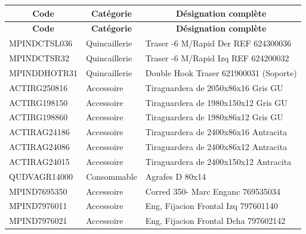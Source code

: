 \documentclass[12pt,a4paper]{article}
\begin{document}
\begin{longtable}{|p{3cm}|p{3cm}|p{8cm}|}
\hline
\multicolumn{1}{|c|}{\textbf{Code}} & \multicolumn{1}{c|}{\textbf{Catégorie}} & \multicolumn{1}{c|}{\textbf{Désignation complète}} \\
\hline
\endfirsthead
\hline
\multicolumn{1}{|c|}{\textbf{Code}} & \multicolumn{1}{c|}{\textbf{Catégorie}} & \multicolumn{1}{c|}{\textbf{Désignation complète}} \\
\hline
\endhead
\hline
\endfoot
MPINDCTSL036 & Quincaillerie & Traser -6 M/Rapid Der REF 624300036 \\
MPINDCTSR32 & Quincaillerie & Traser -6 M/Rapid Izq REF 624200032 \\
MPINDDHOTR31 & Quincaillerie & Double Hook Traser 621900031 (Soporte) \\
ACTIRG250816 & Accessoire & Tiraguardera de 2050x86x16 Gris GU \\
ACTIRG198150 & Accessoire & Tiraguardera de 1980x150x12 Gris GU \\
ACTIRG198860 & Accessoire & Tiraguardera de 1980x86x12 Gris GU \\
ACTIRAG24186 & Accessoire & Tiraguardera de 2400x86x16 Antracita \\
ACTIRAG24086 & Accessoire & Tiraguardera de 2400x86x12 Antracita \\
ACTIRAG24015 & Accessoire & Tiraguardera de 2400x150x12 Antracita \\
QUDVAGR14000 & Consommable & Agrafes D 80x14 \\
MPIND7695350 & Accessoire & Corred 350- Marc Enganc 769535034 \\
MPIND7976011 & Accessoire & Eng, Fijacion Frontal Izq 797601140 \\
MPIND7976021 & Accessoire & Eng, Fijacion Frontal Dcha 797602142 \\
\hline
\end{longtable}
\end{document}
